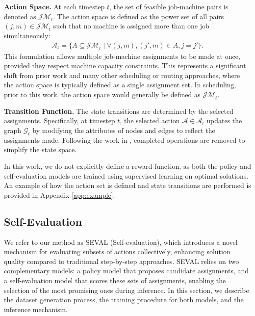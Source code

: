 \textbf{Action Space.} At each timestep $t$, the set of feasible job-machine pairs is denoted as $\mathcal{JM}_t$. The action space is defined as the power set of all pairs $(j, m) \in \mathcal{JM}_t$ such that no machine is assigned more than one job simultaneously:
\begin{align}
\mathcal{A}_t = \{A \subseteq \mathcal{JM}_t \mid \forall (j, m), (j', m) \in A, j = j' \}.
\end{align}
This formulation allows multiple job-machine assignments to be made at once, provided they respect machine capacity constraints. This represents a significant shift from prior work \cite{echeverria2024multi} and many other scheduling \cite{wang2023flexible, tassel2023end} or routing \cite{kwon2020pomo, drakulic2024bq} approaches, where the action space is typically defined as a single assignment set. In scheduling, prior to this work, the action space would generally be defined as $\mathcal{JM}_t$.

\textbf{Transition Function.} The state transitions are determined by the selected assignments. Specifically, at timestep $t$, the selected action $\mathcal{A} \in \mathcal{A}_t$ updates the graph $\mathcal{G}_t$ by modifying the attributes of nodes and edges to reflect the assignments made. Following the work in \cite{ho2024residual, echeverria2025diverse}, completed operations are removed to simplify the state space.

In this work, we do not explicitly define a reward function, as both the policy and self-evaluation models are trained using supervised learning on optimal solutions. An example of how the action set is defined and state transitions are performed is provided in Appendix \ref{app:example}.

\subsection{Self-Evaluation}

We refer to our method as SEVAL (Self-evaluation), which introduces a novel mechanism for evaluating subsets of actions collectively, enhancing solution quality compared to traditional step-by-step approaches. SEVAL relies on two complementary models: a policy model that proposes candidate assignments, and a self-evaluation model that scores these sets of assignments, enabling the selection of the most promising ones during inference. In this section, we describe the dataset generation process, the training procedure for both models, and the inference mechanism.


